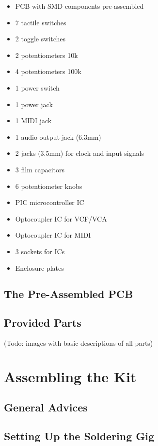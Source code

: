 \documentclass{scrartcl}
\begin{document}
\begin{itemize}
    \item PCB with SMD components pre-assembled
    \item 7 tactile switches
    \item 2 toggle switches
    \item 2 potentiometers 10k
    \item 4 potentiometers 100k
    \item 1 power switch
    \item 1 power jack
    \item 1 MIDI jack
    \item 1 audio output jack (6.3mm)
    \item 2 jacks (3.5mm) for clock and input signals
    \item 3 film capacitors
    \item 6 potentiometer knobs
    \item PIC microcontroller IC
    \item Optocoupler IC for VCF/VCA
    \item Optocoupler IC for MIDI
    \item 3 sockets for ICs
    \item Enclosure plates
\end{itemize}

\subsection{The Pre-Assembled PCB}

\subsection{Provided Parts}

(Todo: images with basic descriptions of all parts)


\section{Assembling the Kit}

\subsection{General Advices}

\subsection{Setting Up the Soldering Gig}
\end{document}
